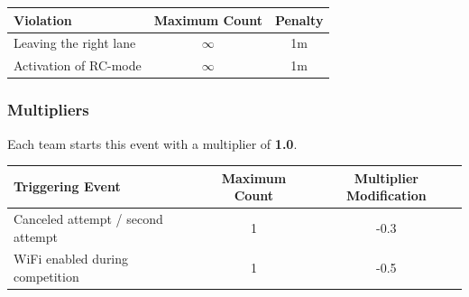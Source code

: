 \begin{table}[H]
    \begin{tabular}{@{}lcc@{}}
        \toprule
        \textbf{Violation}     & \textbf{Maximum Count} & \textbf{Penalty} \\ \midrule
        Leaving the right lane & $\infty$               & 1m               \\
        Activation of RC-mode  & $\infty$               & 1m               \\
        \bottomrule
    \end{tabular}
\end{table}

\subsubsection{Multipliers}
\label{navigation_multipliers}

Each team starts this event with a multiplier of \textbf{1.0}.

\begin{table}[H]
    \begin{tabular}{@{}lcc@{}}
        \toprule
        \textbf{Triggering Event}         & \textbf{Maximum Count} & \textbf{Multiplier Modification} \\ \midrule
        Canceled attempt / second attempt & 1                      & -0.3                             \\
        WiFi enabled during competition   & 1                      & -0.5                             \\
        \bottomrule
    \end{tabular}
\end{table}